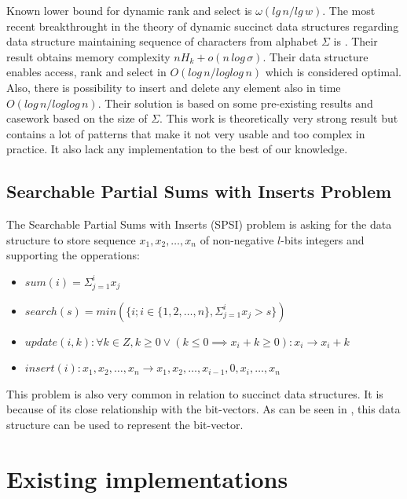Known lower bound for dynamic rank and select is $\omega(lg\,n/lg\,w)$\cite{beame2002optimal}. The most recent breakthrought in the theory of dynamic succinct data structures regarding data structure maintaining sequence of characters from alphabet $\Sigma$ is \cite{munro2015compressed}. Their result obtains memory complexity $nH_k+o(n\,log\,\sigma)$. Their data structure enables access, rank and select in $O(log\,n/log log\,n)$ which is considered optimal. Also, there is possibility to insert and delete any element also in time $O(log\,n/log log\,n)$. Their solution is based on some pre-existing results and casework based on the size of $\Sigma$. This work is theoretically very strong result but contains a lot of patterns that make it not very usable and too complex in practice. It also lack any implementation to the best of our knowledge.

\subsection{Searchable Partial Sums with Inserts Problem}

\begin{theorem}
The Searchable Partial Sums with Inserts (SPSI) problem is asking for the data structure to
store sequence $x_1, x_2, \ldots , x_n$ of non-negative $l$-bits integers and supporting the opperations:
\begin{itemize}
    \item $sum(i) = \Sigma_{j=1}^{i} x_j$
    \item $search(s) = min(\{i; i\in \{1, 2,\ldots, n\}, \Sigma_{j=1}^{i} x_j > s \})$
    \item $update(i, k): \forall k \in Z, k \geq 0 \lor (k\leq 0 \implies x_i + k \geq 0): x_i \rightarrow x_i + k$
    \item $insert(i): x_1, x_2,\ldots, x_n \rightarrow x_1, x_2,\ldots , x_{i-1}, 0, x_{i}, \ldots , x_n$
\end{itemize}
\end{theorem}

This problem is also very common in relation to succinct data structures. It is because of its close relationship with the bit-vectors.
As can be seen in \cite{prezza2017framework}, this data structure can be used to represent the bit-vector.

\section{Existing implementations}

